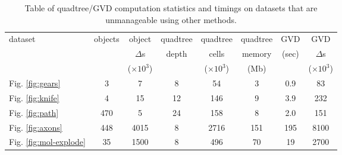 \documentclass{egpubl}
\begin{document}

\begin{table*}
  \centering
  \footnotesize{
  \begin{tabular}{l c c c c c c c}
    \toprule
    dataset & objects & object          & quadtree   & quadtree          & quadtree &
    GVD   & GVD             \\
            &         & $\Delta$s       & depth    & cells           & memory &
    (sec) & $\Delta$s       \\
            &         & ($\times 10^3$) &          & ($\times 10^3$) & (Mb)   &
          & ($\times 10^3$) \\
    \midrule
    Fig. \ref{fig:gears} & 3 & 7 & 8 & 54 & 3 & 0.9 & 83\\
    Fig. \ref{fig:knife} & 4 & 15 & 12 & 146 & 9 & 3.9 & 232 \\
    Fig. \ref{fig:path} & 470 & 5 & 24 & 158 & 8 & 2.0 & 151 \\
    Fig. \ref{fig:axons} & 448 & 4015 & 8 & 2716 & 151 & 195 & 8100 \\
    Fig. \ref{fig:mol-explode} & 35 & 1500 & 8 & 496 & 70 & 19 & 2700 \\
    \bottomrule
  \end{tabular}}
  \caption{Table of quadtree/GVD computation statistics and timings on datasets that are unmanageable using other methods. }
  \label{tab:timings}
\end{table*}
\end{document}
